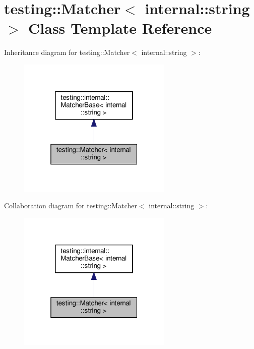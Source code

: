 \hypertarget{classtesting_1_1_matcher_3_01internal_1_1string_01_4}{}\section{testing\+:\+:Matcher$<$ internal\+:\+:string $>$ Class Template Reference}
\label{classtesting_1_1_matcher_3_01internal_1_1string_01_4}


Inheritance diagram for testing\+:\+:Matcher$<$ internal\+:\+:string $>$\+:
\nopagebreak
\begin{figure}[H]
\begin{center}
\leavevmode
\includegraphics[width=208pt]{classtesting_1_1_matcher_3_01internal_1_1string_01_4__inherit__graph}
\end{center}
\end{figure}


Collaboration diagram for testing\+:\+:Matcher$<$ internal\+:\+:string $>$\+:
\nopagebreak
\begin{figure}[H]
\begin{center}
\leavevmode
\includegraphics[width=208pt]{classtesting_1_1_matcher_3_01internal_1_1string_01_4__coll__graph}
\end{center}
\end{figure}
